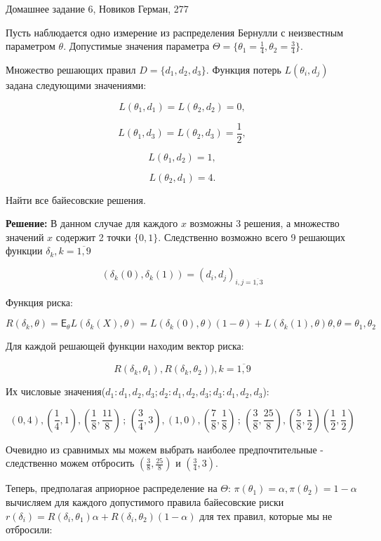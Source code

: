 \documentclass[12pt]{article}
\theoremstyle{definiton}
\theoremstyle{definition}
\theoremstyle{definition}
\newcommand{\Expect}{\mathsf{E}}
\newcounter{problem}
\newcounter{subproblem}
\def\prp{\medskip\noindent\stepcounter{problem}{\bf Задача \theproblem .  }\setcounter{subproblem}{0} }
\begin{document}
\centerline{\LARGE Домашнее задание 6, Новиков Герман, 277}

\medskip


\prp Пусть наблюдается одно измерение из распределения Бернулли с неизвестным параметром $\theta$. Допустимые значения параметра $\Theta = \{\theta_1 = \frac14, \theta_2 = \frac34 \}$.

Множество решающих правил $D = \{ d_1, d_2, d_3 \}$. Функция потерь $L(\theta_i,d_j)$ задана следующими значениями:

$$L(\theta_1, d_1) = L(\theta_2, d_2) = 0,$$

$$L(\theta_1, d_3) = L(\theta_2, d_3) = \frac12,$$

$$L(\theta_1, d_2) = 1,$$

$$L(\theta_2, d_1) = 4.$$

Найти все байесовские решения.

\textbf{Решение: } В данном случае для каждого $x$ возможны 3 решения, а множество значений $x$ содержит 2 точки $\{0, 1\}$. Следственно возможно всего 9 решающих функции $\delta_k, k = \overline{1,9}$

$$(\delta_k(0),\delta_k(1)) = (d_i, d_j)_{i,j=\overline{1,3}}$$

Функция риска:

$$R(\delta_k, \theta) = \Expect_{\theta} L(\delta_k(X),\theta) = L(\delta_k(0),\theta)(1-\theta) + L(\delta_k(1),\theta)\theta, \theta = \theta_1, \theta_2$$

Для каждой решающей функции находим вектор риска:

$$R(\delta_k,\theta_1), R(\delta_k, \theta_2)), k=\overline{1,9}$$

Их числовые значения($d_1:d_1,d_2,d_3; d_2:d_1,d_2,d_3; d_3:d_1,d_2,d_3$):

$$(0,4), (\frac14,1	),(\frac18,\frac{11}{8}) \,;\, (\frac34,3), (1,0), (\frac78,\frac18) \,;\, (\frac{3}{8},\frac{25}{8}	),(\frac58,\frac12)(\frac12,\frac12)$$

Очевидно из сравнимых мы можем выбрать наиболее предпочтительные - следственно можем отбросить $(\frac{3}{8},\frac{25}{8}	)$ и $(\frac34,3)$.

Теперь, предполагая априорное распределение на $\Theta$: $\pi (\theta_1) = \alpha, \pi (\theta_2) = 1 - \alpha$ вычисляем для каждого допустимого правила байесовские риски $r(\delta_i) = R(\delta_i, \theta_1 ) \alpha + R(\delta_i,\theta_2 )(1- \alpha )$ для тех правил, которые мы не отбросили:
\end{document}
